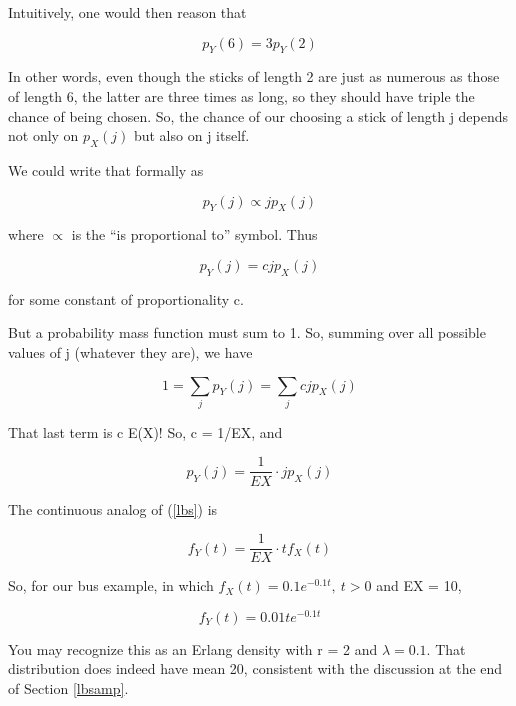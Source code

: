 Intuitively, one would then reason that 

\begin{equation}
p_Y(6) = 3 p_Y(2) 
\end{equation}

In other words, even though the sticks of length 2 are just as numerous
as those of length 6, the latter are three times as long, so they should
have triple the chance of being chosen.  So, the chance of our choosing
a stick of length j depends not only on $p_X(j)$ but also on j itself.

We could write that formally as

\begin{equation}
p_Y(j) \propto j p_X(j)
\end{equation}

where $\propto$ is the ``is proportional to'' symbol.  Thus

\begin{equation}
p_Y(j) = c j p_X(j)
\end{equation}

for some constant of proportionality c.

But a probability mass function must sum to 1.  So, summing over all
possible values of j (whatever they are), we have

\begin{equation}
1 = \sum_{j} p_Y(j) = \sum_{j} c j p_X(j) 
\end{equation}

That last term is c E(X)!  So, c = 1/EX, and

\begin{equation}
\label{lbs}
p_Y(j) = \frac{1}{EX} \cdot j p_X(j)
\end{equation}


The continuous analog of (\ref{lbs}) is

\begin{equation}
\label{lbscontin}
f_Y(t) = \frac{1}{EX} \cdot t f_X(t)
\end{equation}

So, for our bus example, in which $f_X(t) = 0.1e^{-0.1 t}, ~ t > 0$ and
EX = 10,

\begin{equation}
f_Y(t) = 0.01 t e^{-0.1 t}
\end{equation}

You may recognize this as an Erlang density with r = 2 and $\lambda =
0.1$.  That distribution does indeed have mean 20, consistent with the
discussion at the end of Section \ref{lbsamp}.
